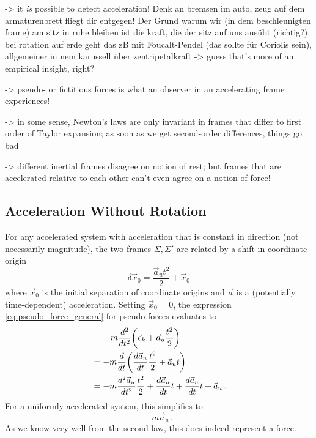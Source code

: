 \documentclass[../class_mech_main.tex]{subfiles}
\begin{document}
-> it \emph{is} possible to detect acceleration! Denk an bremsen im auto, zeug auf dem armaturenbrett fliegt dir entgegen! Der Grund warum wir (in dem beschleunigten frame) am sitz in ruhe bleiben ist die kraft, die der sitz auf uns ausübt (richtig?). bei rotation auf erde geht das zB mit Foucalt-Pendel (das sollte für Coriolis sein), allgemeiner in nem karussell über zentripetalkraft -> guess that's more of an empirical insight, right?


-> pseudo- or fictitious forces is what an observer in an accelerating frame experiences!


-> in some sense, Newton's laws are only invariant in frames that differ to first order of Taylor expansion; as soon as we get second-order differences, things go bad

-> different inertial frames disagree on notion of rest; but frames that are accelerated relative to each other can't even agree on a notion of force!





		\subsection{Acceleration Without Rotation}
For any accelerated system with acceleration that is constant in direction (not necessarily magnitude), the two frames $\Sigma, \Sigma'$ are related by a shift in coordinate origin
\begin{equation}
	\delta \vec{x}_0 = \frac{\vec{a}_u t^2}{2} + \vec{x}_0
\end{equation}
where $\vec{x}_0$ is the initial separation of coordinate origins and $\vec{a}$ is a (potentially time-dependent) acceleration. Setting $\vec{x}_0 = 0$, the expression \eqref{eq:pseudo_force_general} for pseudo-forces evaluates to
\begin{align}
	&\quad - m \dv[2]{t} \qty(\vec{e}_k + \vec{a}_u \frac{t^2}{2})
	\notag\\
	&= - m \dv{t} \qty(\dv{\vec{a}_u}{t} \frac{t^2}{2} + \vec{a}_u t)
	\notag\\
	&= - m \dv[2]{\vec{a}_u}{t} \frac{t^2}{2} + \dv{\vec{a}_u}{t} t + \dv{\vec{a}_u}{t} t + \vec{a}_u
	\, .
\end{align}
For a uniformly accelerated system, this simplifies to
\begin{equation}
	- m \vec{a}_u \, .
\end{equation}
As we know very well from the second law, this does indeed represent a force.
\end{document}
